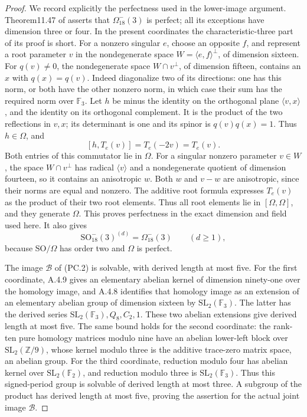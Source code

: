 \begin{proof}
We record explicitly the perfectness used in the lower-image
argument. Theorem11.47 of \cite[pp.~161--162]{GhostTaylorClassical}
asserts that \(\Omega_{18}^-(3)\) is perfect; all its exceptions
have dimension three or four. In the present coordinates the
characteristic-three part of its proof is short. For a
nonzero singular \(e\), choose an opposite \(f\), and represent
a root parameter \(v\) in the nondegenerate space
\(W=\langle e,f\rangle^\perp\), of dimension sixteen.
For \(q(v)\ne0\), the nondegenerate space
\(W\cap v^\perp\), of dimension fifteen, contains an \(x\)
with \(q(x)=q(v)\). Indeed diagonalize two of its directions:
one has this norm, or both have the other nonzero norm, in
which case their sum has the required norm over \(\mathbb F_3\).
Let \(h\) be minus the identity on the orthogonal plane
\(\langle v,x\rangle\), and the identity on its orthogonal
complement. It is the product of the two reflections in
\(v,x\); its determinant is one and its spinor is
\(q(v)q(x)=1\). Thus \(h\in\Omega\), and
\[
                  [h,T_e(v)]=T_e(-2v)=T_e(v).
 \tag{PC.5}
\]
Both entries of this commutator lie in \(\Omega\).
For a singular nonzero parameter \(v\in W\), the space
\(W\cap v^\perp\) has radical \(\langle v\rangle\)
and a nondegenerate quotient of dimension fourteen, so
it contains an anisotropic \(w\). Both \(w\) and \(v-w\)
are anisotropic, since their norms are equal and nonzero.
The additive root formula expresses \(T_e(v)\) as the
product of their two root elements. Thus all root elements
lie in \([\Omega,\Omega]\), and they generate \(\Omega\).
This proves perfectness in the exact dimension and field
used here. It also gives
\[
             \mathrm{SO}_{18}^-(3)^{(d)}=\Omega_{18}^-(3)
                          \qquad(d\ge1),
 \tag{PC.6}
\]
because \(\mathrm{SO}/\Omega\) has order two and \(\Omega\)
is perfect.

The image \(\mathcal B\) of (PC.2) is solvable, with
derived length at most five. For the first coordinate,
A.4.9 gives an elementary abelian kernel of dimension
ninety-one over the homology image, and A.4.8 identifies
that homology image as an extension of an elementary
abelian group of dimension sixteen by
\(\mathrm{SL}_2(\mathbb F_3)\). The latter has the
derived series
\(\mathrm{SL}_2(\mathbb F_3),Q_8,C_2,1\).
These two abelian extensions give derived length at
most five. The same bound holds for the second coordinate:
the rank-ten pure homology matrices modulo nine have
an abelian lower-left block over
\(\mathrm{SL}_2(\mathbb Z/9)\), whose kernel modulo
three is the additive trace-zero matrix space, an abelian
group. For the third coordinate, reduction modulo four
has abelian kernel over \(\mathrm{SL}_2(\mathbb F_2)\),
and reduction modulo three is
\(\mathrm{SL}_2(\mathbb F_3)\). Thus this signed-period
group is solvable of derived length at most three.
A subgroup of the product has derived length at most
five, proving the assertion for the actual joint image
\(\mathcal B\).


\end{proof}
